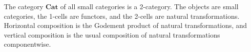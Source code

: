 The category $\mathbf{Cat}$ of all small categories is a 2-category. The objects are small categories, the 1-cells are functors, and the 2-cells are natural transformations. Horizontal composition is the Godement product of natural transformations, and vertical composition is the usual composition of natural transformations componentwise.
